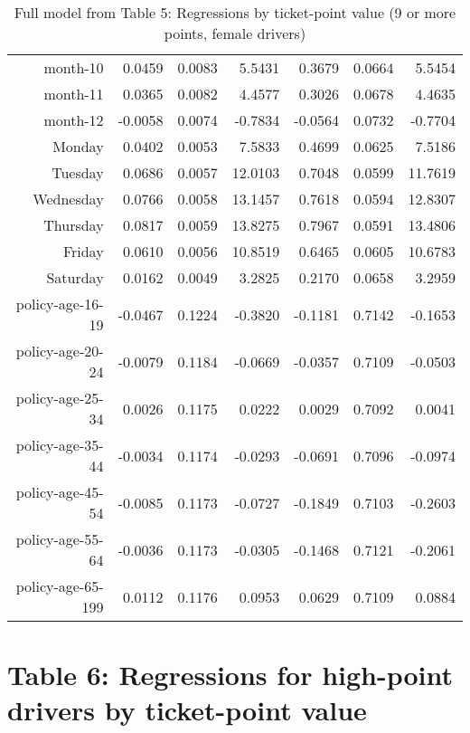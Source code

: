 \documentclass[10pt]{article}
\begin{document}
\begin{table}[ht]
\begin{tabular}{rrrrrrr}
  month-10 & 0.0459 & 0.0083 & 5.5431 & 0.3679 & 0.0664 & 5.5454 \\ 
  month-11 & 0.0365 & 0.0082 & 4.4577 & 0.3026 & 0.0678 & 4.4635 \\ 
  month-12 & -0.0058 & 0.0074 & -0.7834 & -0.0564 & 0.0732 & -0.7704 \\ 
  Monday & 0.0402 & 0.0053 & 7.5833 & 0.4699 & 0.0625 & 7.5186 \\ 
  Tuesday & 0.0686 & 0.0057 & 12.0103 & 0.7048 & 0.0599 & 11.7619 \\ 
  Wednesday & 0.0766 & 0.0058 & 13.1457 & 0.7618 & 0.0594 & 12.8307 \\ 
  Thursday & 0.0817 & 0.0059 & 13.8275 & 0.7967 & 0.0591 & 13.4806 \\ 
  Friday & 0.0610 & 0.0056 & 10.8519 & 0.6465 & 0.0605 & 10.6783 \\ 
  Saturday & 0.0162 & 0.0049 & 3.2825 & 0.2170 & 0.0658 & 3.2959 \\ 
  policy-age-16-19 & -0.0467 & 0.1224 & -0.3820 & -0.1181 & 0.7142 & -0.1653 \\ 
  policy-age-20-24 & -0.0079 & 0.1184 & -0.0669 & -0.0357 & 0.7109 & -0.0503 \\ 
  policy-age-25-34 & 0.0026 & 0.1175 & 0.0222 & 0.0029 & 0.7092 & 0.0041 \\ 
  policy-age-35-44 & -0.0034 & 0.1174 & -0.0293 & -0.0691 & 0.7096 & -0.0974 \\ 
  policy-age-45-54 & -0.0085 & 0.1173 & -0.0727 & -0.1849 & 0.7103 & -0.2603 \\ 
  policy-age-55-64 & -0.0036 & 0.1173 & -0.0305 & -0.1468 & 0.7121 & -0.2061 \\ 
  policy-age-65-199 & 0.0112 & 0.1176 & 0.0953 & 0.0629 & 0.7109 & 0.0884 \\ 
   \hline
\end{tabular}
\caption{Full model from Table 5: Regressions by ticket-point value (9 or more points, female drivers)} 
\label{tab_5_9plus_pts_F}
\end{table}


\clearpage
\pagebreak




\section*{Table 6: Regressions for high-point drivers by ticket-point value}
\end{document}
